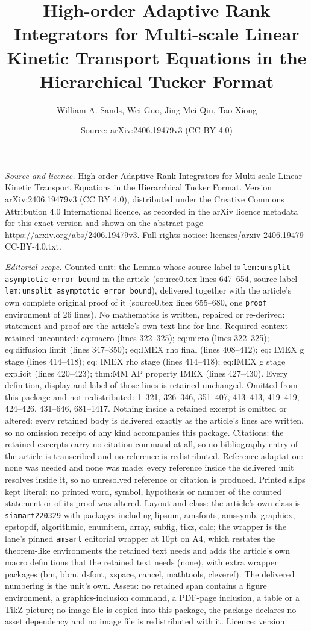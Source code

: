 \documentclass[10pt,a4paper]{amsart}
\title[High-order Adaptive Rank Integrators for Multi-scale Linear ]{High-order Adaptive Rank Integrators for Multi-scale Linear Kinetic Transport Equations in the Hierarchical Tucker Format}
\author{William A. Sands, Wei Guo, Jing-Mei Qiu, Tao Xiong}
\date{Source: arXiv:2406.19479v3 (CC BY 4.0)}
\begin{document}
\maketitle

\noindent\emph{Source and licence.} High-order Adaptive Rank Integrators for Multi-scale Linear Kinetic Transport Equations in the Hierarchical Tucker Format. Version arXiv:2406.19479v3 (CC BY 4.0), distributed under the Creative Commons Attribution 4.0 International licence, as recorded in the arXiv licence metadata for this exact version and shown on the abstract page https://arxiv.org/abs/2406.19479v3. Full rights notice: licenses/arxiv-2406.19479-CC-BY-4.0.txt.\par\smallskip

\noindent\textit{Editorial scope.} Counted unit: the Lemma whose source label is \texttt{lem:unsplit asymptotic error bound} in the article (source0.tex lines 647--654, source label \texttt{lem:unsplit asymptotic error bound}), delivered together with the article's own complete original proof of it (source0.tex lines 655--680, one \texttt{proof} environment of 26 lines). No mathematics is written, repaired or re-derived: statement and proof are the article's own text line for line. Required context retained uncounted: eq:macro (lines 322--325); eq:micro (lines 322--325); eq:diffusion limit (lines 347--350); eq:IMEX rho final (lines 408--412); eq: IMEX g stage (lines 414--418); eq: IMEX rho stage (lines 414--418); eq:IMEX g stage explicit (lines 420--423); thm:MM AP property IMEX (lines 427--430). Every definition, display and label of those lines is retained unchanged. Omitted from this package and not redistributed: 1--321, 326--346, 351--407, 413--413, 419--419, 424--426, 431--646, 681--1417. Nothing inside a retained excerpt is omitted or altered: every retained body is delivered exactly as the article's lines are written, so no omission receipt of any kind accompanies this package. Citations: the retained excerpts carry no citation command at all, so no bibliography entry of the article is transcribed and no reference is redistributed. Reference adaptation: none was needed and none was made; every reference inside the delivered unit resolves inside it, so no unresolved reference or citation is produced. Printed slips kept literal: no printed word, symbol, hypothesis or number of the counted statement or of its proof was altered. Layout and class: the article's own class is \texttt{siamart220329} with packages including lipsum, amsfonts, amssymb, graphicx, epstopdf, algorithmic, enumitem, array, subfig, tikz, calc; the wrapper is the lane's pinned \texttt{amsart} editorial wrapper at 10pt on A4, which restates the theorem-like environments the retained text needs and adds the article's own macro definitions that the retained text needs (none), with extra wrapper packages (bm, bbm, dsfont, xspace, cancel, mathtools, cleveref). The delivered numbering is the unit's own. Assets: no retained span contains a figure environment, a graphics-inclusion command, a PDF-page inclusion, a table or a TikZ picture; no image file is copied into this package, the package declares no asset dependency and no image file is redistributed with it. Licence: version 
\end{document}
